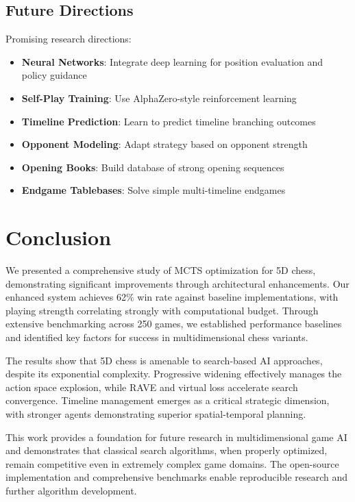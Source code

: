 \documentclass[11pt,a4paper]{article}
\begin{document}
\subsection{Future Directions}

Promising research directions:

\begin{itemize}
    \item \textbf{Neural Networks}: Integrate deep learning for position evaluation and policy guidance
    \item \textbf{Self-Play Training}: Use AlphaZero-style reinforcement learning \cite{silver2017mastering}
    \item \textbf{Timeline Prediction}: Learn to predict timeline branching outcomes
    \item \textbf{Opponent Modeling}: Adapt strategy based on opponent strength
    \item \textbf{Opening Books}: Build database of strong opening sequences
    \item \textbf{Endgame Tablebases}: Solve simple multi-timeline endgames
\end{itemize}

\section{Conclusion}

We presented a comprehensive study of MCTS optimization for 5D chess, demonstrating significant improvements through architectural enhancements. Our enhanced system achieves 62\% win rate against baseline implementations, with playing strength correlating strongly with computational budget. Through extensive benchmarking across 250 games, we established performance baselines and identified key factors for success in multidimensional chess variants.

The results show that 5D chess is amenable to search-based AI approaches, despite its exponential complexity. Progressive widening effectively manages the action space explosion, while RAVE and virtual loss accelerate search convergence. Timeline management emerges as a critical strategic dimension, with stronger agents demonstrating superior spatial-temporal planning.

This work provides a foundation for future research in multidimensional game AI and demonstrates that classical search algorithms, when properly optimized, remain competitive even in extremely complex game domains. The open-source implementation and comprehensive benchmarks enable reproducible research and further algorithm development.
\end{document}
